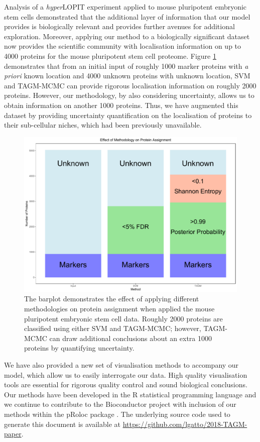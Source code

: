 \documentclass[12pt,english]{article}\usepackage[]{graphicx}\usepackage[]{color}
\begin{document}
Analysis of a \textit{hyper}LOPIT experiment applied to mouse
pluripotent embryonic stem cells demonstrated that the additional
layer of information that our model provides is biologically relevant
and provides further avenues for additional exploration. Moreover,
applying our method to a biologically significant dataset now provides
the scientific community with localisation information on up to 4000
proteins for the mouse pluripotent stem cell proteome. Figure
\ref{figure:ConcludePlot} demonstrates that from an initial input of
roughly 1000 marker proteins with \textit{a priori} known location and
4000 unknown proteins with unknown location, SVM and TAGM-MCMC can
provide rigorous localisation information on roughly 2000
proteins. However, our methodology, by also considering uncertainty,
allows us to obtain information on another 1000 proteins. Thus, we
have augmented this dataset by providing uncertainty quantification on
the localisation of proteins to their sub-cellular niches, which had
been previously unavailable.

\begin{figure}[h]

\centering
\includegraphics[width=.7\textwidth]{ConcludePlot.pdf}
\caption{The barplot demonstrates the effect of applying different
  methodologies on protein assignment when applied the mouse
  pluripotent embryonic stem cell data. Roughly 2000 proteins are
  classified using either SVM and TAGM-MCMC; however, TAGM-MCMC can
  draw additional conclusions about an extra 1000 proteins by
  quantifying uncertainty.}
\label{figure:ConcludePlot}
\end{figure}


We have also provided a new set of visualisation methods to accompany
our model, which allow us to easily interrogate our data. High quality
visualisation tools are essential for rigorous quality control and
sound biological conclusions.  Our methods have been developed in the
R statistical programming language and we continue to contribute to
the Bioconductor project \citep{Bioconductor::2004, Huber::2015} with
inclusion of our methods within the pRoloc package
\citep{pRoloc:2014}. The underlying source code used to generate this
document is available at
\url{https://github.com/lgatto/2018-TAGM-paper}.
\end{document}
